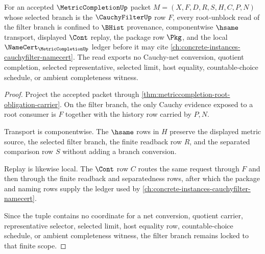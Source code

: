 \begin{theorem}
\label{thm:metriccompletion-filter-scope-lock}
For an accepted $\MetricCompletionUp$ packet $M=(X,F,D,R,S,H,C,P,N)$ whose selected branch is the $\CauchyFilterUp$ row $F$, every root-unblock read of the filter branch is confined to $\BHist$ provenance, componentwise $\hsame$ transport, displayed $\Cont$ replay, the package row $\Pkg$, and the local $\NameCert_{\MetricCompletionUp}$ ledger before it may cite \autoref{ch:concrete-instances-cauchyfilter-namecert}. The read exports no Cauchy-net conversion, quotient completion, selected representative, selected limit, host equality, countable-choice schedule, or ambient completeness witness.
\end{theorem}
\begin{proof}
Project the accepted packet through \autoref{thm:metriccompletion-root-obligation-carrier}. On the filter branch, the only Cauchy evidence exposed to a root consumer is $F$ together with the history row carried by $P,N$.

Transport is componentwise. The $\hsame$ rows in $H$ preserve the displayed metric source, the selected filter branch, the finite readback row $R$, and the separated comparison row $S$ without adding a branch conversion.

Replay is likewise local. The $\Cont$ row $C$ routes the same request through $F$ and then through the finite readback and separatedness rows, after which the package and naming rows supply the ledger used by \autoref{ch:concrete-instances-cauchyfilter-namecert}.

Since the tuple contains no coordinate for a net conversion, quotient carrier, representative selector, selected limit, host equality row, countable-choice schedule, or ambient completeness witness, the filter branch remains locked to that finite scope.
\end{proof}

